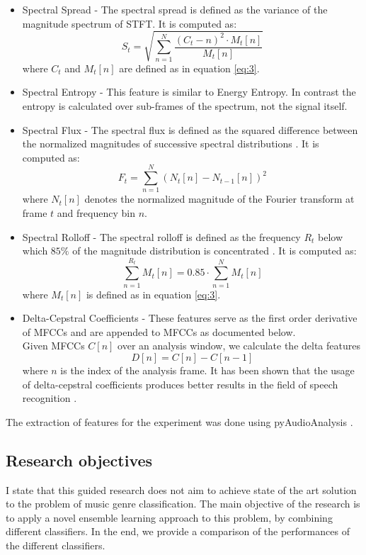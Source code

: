 \documentclass[a4paper,11pt,oneside]{article}
\begin{document}
\begin{itemize}
  \item Spectral Spread - The spectral spread is defined as the variance of the magnitude spectrum of STFT.
  It is computed as:
  \begin{equation}
    S_t = \sqrt{\sum_{n=1}^N \frac{(C_t-n)^2\cdot M_t[n]}{M_t[n]}}
  \end{equation} where $C_t$ and $M_t[n]$ are defined as in equation \ref{eq:3}.
  \item Spectral Entropy - This feature is similar to Energy Entropy. In contrast the entropy is
  calculated over sub-frames of the spectrum, not the signal itself.
  \item Spectral Flux - The spectral flux is defined as the squared difference between the normalized magnitudes
  of successive spectral distributions \cite{tzan}. It is computed as:
  \begin{equation}
    F_t = \sum_{n=1}^N (N_t[n]-N_{t-1}[n])^2
  \end{equation} where $N_t[n]$ denotes the normalized magnitude of the Fourier 
  transform at frame $t$ and frequency bin $n$.
  \item Spectral Rolloff - The spectral rolloff is defined as the frequency $R_t$ below which $85\%$ of the magnitude
  distribution is concentrated \cite{tzan}. It is computed as:
  \begin{equation}
    \sum_{n=1}^{R_t} M_t[n] = 0.85 \cdot \sum_{n=1}^N M_t[n]
  \end{equation} where $M_t[n]$ is defined as in equation \ref{eq:3}.
  \item Delta-Cepstral Coefficients - These features serve as the first order derivative of MFCCs and
   are appended to MFCCs as documented below.\\
  Given MFCCs $C[n]$ over an analysis window, we calculate the delta features
  \begin{equation}
    D[n] = C[n]-C[n-1]
  \end{equation} where $n$ is the index of the analysis frame. It has been shown that the usage of delta-cepstral
  coefficients produces better results in the field of speech recognition \cite{kumar2011delta}.
\end{itemize}
The extraction of features for the experiment was done using pyAudioAnalysis \cite{giannakopoulos2015pyaudioanalysis}.
\subsection{Research objectives}
I state that this guided research does not aim to achieve state of the art solution to the problem of music genre 
classification. The main objective of the research is to apply a novel ensemble learning approach to this problem, by combining different classifiers. In the end, we provide a comparison of the performances of the different classifiers. 
\end{document}
